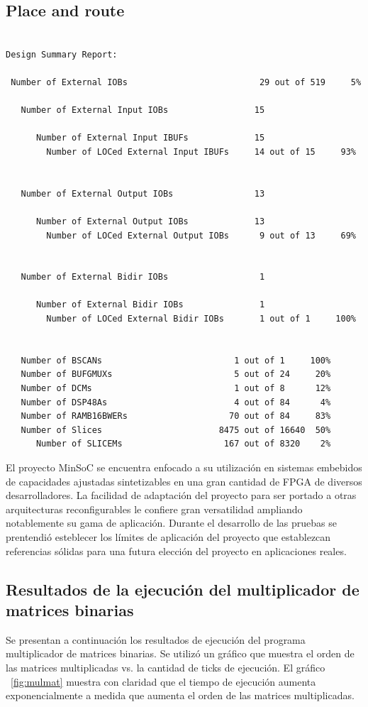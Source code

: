 		\subsection{Place and route}	
\begin{lstlisting}[frame=single,caption={Resultado de PAR},label={lst:salidas},breaklines]

Design Summary Report:

 Number of External IOBs                          29 out of 519     5%

   Number of External Input IOBs                 15

      Number of External Input IBUFs             15
        Number of LOCed External Input IBUFs     14 out of 15     93%


   Number of External Output IOBs                13

      Number of External Output IOBs             13
        Number of LOCed External Output IOBs      9 out of 13     69%


   Number of External Bidir IOBs                  1

      Number of External Bidir IOBs               1
        Number of LOCed External Bidir IOBs       1 out of 1     100%


   Number of BSCANs                          1 out of 1     100%
   Number of BUFGMUXs                        5 out of 24     20%
   Number of DCMs                            1 out of 8      12%
   Number of DSP48As                         4 out of 84      4%
   Number of RAMB16BWERs                    70 out of 84     83%
   Number of Slices                       8475 out of 16640  50%
      Number of SLICEMs                    167 out of 8320    2%
\end{lstlisting}

	El proyecto MinSoC se encuentra enfocado a su utilización en sistemas embebidos de capacidades ajustadas sintetizables en una gran cantidad de FPGA
	de diversos desarrolladores. La facilidad de adaptación del proyecto para ser portado a otras arquitecturas reconfigurables le confiere gran
	versatilidad ampliando notablemente su gama de aplicación.
	Durante el desarrollo de las pruebas se prentendió esteblecer los límites de aplicación del proyecto que establezcan referencias sólidas para una
	futura elección del proyecto en aplicaciones reales.

\newpage
		\subsection{Resultados de la ejecución del multiplicador de matrices binarias}
		Se presentan a continuación los resultados de ejecución del programa multiplicador de matrices binarias. Se utilizó un gráfico que muestra el orden
		de las matrices multiplicadas vs. la cantidad de ticks de ejecución. El gráfico ~\ref{fig:mulmat} muestra con claridad que el tiempo de ejecución
		aumenta exponencialmente a medida que aumenta el orden de las matrices multiplicadas.  
		
